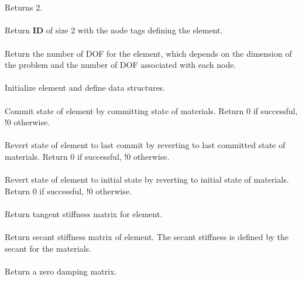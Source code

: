   \\
 \\
Returns 2.
\\

 \\
Return {\bf ID} of size $2$ with the node tags defining the element.
\\

 \\	
Return the number of DOF for the element, which depends on the dimension of the problem
and the number of DOF associated with each node.
\\

 \\
Initialize element and define data structures.
\\

 \\
Commit state of element by committing state of materials.
Return 0 if successful, !0 otherwise.
\\

 \\        
Revert state of element to last commit by reverting to last committed state of materials.
Return 0 if successful, !0 otherwise.
\\

 \\        
Revert state of element to initial state by reverting to initial state of materials.
Return 0 if successful, !0 otherwise.
\\

 \\
Return tangent stiffness matrix for element.
\\

 \\    
Return secant stiffness matrix of element.  The secant stiffness is
defined by the secant for the materials.
\\

 \\    
Return a zero damping matrix.
\\


